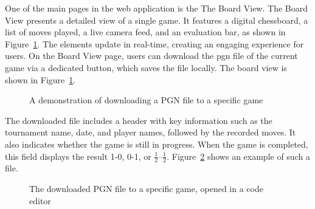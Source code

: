 One of the main pages in the web application is the The Board View. The Board View presents a detailed view of a single game. It features a digital chessboard, a list of moves played, a live camera feed, and an evaluation bar, as shown in Figure~\ref{fig:download-pgn}. The elements update in real-time, creating an engaging experience for users. On the Board View page, users can download the \gls{pgn} file of the current game via a dedicated button, which saves the file locally. The board view is shown in Figure~\ref{fig:download-pgn}. \\

\begin{figure}[h!] \centering {}\caption[Preview of downloading a PGN file]{A demonstration of downloading a PGN file to a specific game}\label{fig:download-pgn} \end{figure}

The downloaded file includes a header with key information such as the tournament name, date, and player names, followed by the recorded moves. It also indicates whether the game is still in progress. When the game is completed, this field displays the result 1-0, 0-1, or $\frac{1}{2}$–$\frac{1}{2}$. Figure~\ref{fig:downloaded-pgn} shows an example of such a file. \\

\begin{figure}[h!] \centering {}\caption[The downloaded PGN file]{The downloaded PGN file to a specific game, opened in a code editor}\label{fig:downloaded-pgn} \end{figure}


